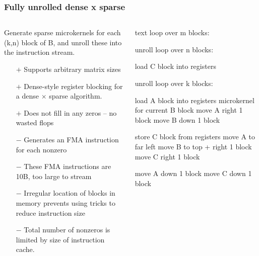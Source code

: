 \documentclass[9pt]{beamer}
\begin{document}
\begin{frame}[fragile]
  \frametitle{Fully unrolled dense x sparse}
  \begin{columns}[t]%
    \begin{column}{0.5\textwidth}
      Generate sparse microkernels for each (k,n) block of B, and unroll these into the instruction stream.
      \begin{itemize}
      \item[$+$] Supports arbitrary matrix sizes
      \item[$+$] Dense-style register blocking for a dense $\times$ sparse algorithm.
      \item[$+$] Does not fill in any zeros -- no wasted flops

      \item[$-$] Generates an FMA instruction for each nonzero
      \item[$-$] These FMA instructions are 10B, too large to stream
      \item[$-$] Irregular location of blocks in memory prevents using tricks to reduce instruction size
      \item[$-$] Total number of nonzeros is limited by size of instruction cache.

      \end{itemize}
    \end{column}
    \begin{column}{0.5\textwidth}
      \begin{ccode}[]
        {text}
        loop over m blocks:

           unroll loop over n blocks:

              load C block into registers

              unroll loop over k blocks:

                 load A block into registers
                 microkernel for current B block
                 move A right 1 block
                 move B down 1 block

              store C block from registers
              move A to far left
              move B to top + right 1 block
              move C right 1 block

           move A down 1 block
           move C down 1 block
      \end{ccode}
    \end{column}
  \end{columns}
\end{frame}
\end{document}
